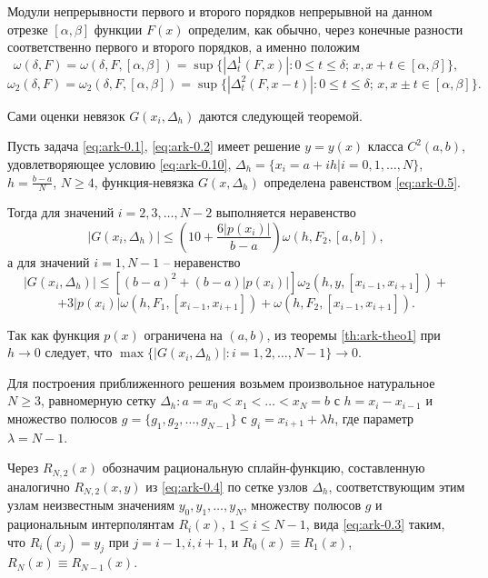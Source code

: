 Модули непрерывности первого и второго порядков непрерывной на данном отрезке 
$[\alpha, \beta]$ функции $F(x)$ определим, как обычно, через конечные разности 
соответственно первого и второго порядков, а именно положим
$$
\omega(\delta, F)=\omega(\delta, F,[\alpha,\beta])=\sup\{|\Delta_t^1(F, x)|:
 0\leqslant t\leqslant \delta;\, x, x+t\in[\alpha, \beta]\},
$$
$$
\omega_2(\delta, F)=\omega_2(\delta, F,[\alpha,\beta])=\sup\{|\Delta_t^2(F, x-t)|:
 0\leqslant t\leqslant \delta; \,x, x\pm t\in[\alpha, \beta]\}.
$$

Сами оценки невязок $G(x_i, \Delta_h)$ даются следующей теоремой.

\begin{theorem} \label{th:ark-theo1}
Пусть задача \eqref{eq:ark-0.1}, \eqref{eq:ark-0.2} имеет решение $y=y(x)$ класса $C^2(a,b)$, удовлетворяющее 
условию \eqref{eq:ark-0.10}, $\Delta_h=\{x_i=a+ih |i=0,1,\dots,N\}$, $h=\frac{b-a}N$,
$N\geqslant 4$, функция-невязка $G(x, \Delta_h)$ определена равенством \eqref{eq:ark-0.5}.

Тогда для значений $i=2,3,\dots,N-2$ выполняется неравенство
\begin{equation}\label{eq:ark-0.12}
|G(x_i,\Delta_h)|\leqslant 
\left(10+\frac{6|p(x_i)|}{b-a}\right)\omega(h, F_2, [a,b]),
\end{equation}
а для значений $i=1,N-1$  -- неравенство
$$
|G(x_i,\Delta_h)|\leqslant [(b-a)^2+(b-a)|p(x_i)|]\omega_2(h, y, [x_{i-1}, x_{i+1}])+
$$
\begin{equation}\label{eq:ark-0.13}
+3|p(x_i)|\omega(h, F_1,[x_{i-1}, x_{i+1}])+
\omega(h, F_2, [x_{i-1}, x_{i+1}]). 
\end{equation}
\end{theorem}

Так как функция $p(x)$ ограничена на $(a,b)$, из теоремы \ref{th:ark-theo1} при $h\to 0$ 
следует, что 
$\max\{|G(x_i, \Delta_h)|: i=1,2,\dots,N-1\}\to 0$.

Для построения приближенного решения возьмем произвольное натуральное $N\geqslant 3$, 
равномерную сетку 
$\Delta_h: a=x_0<x_1<\dots<x_N=b$ с $h=x_i-x_{i-1}$ и множество полюсов 
$g=\{g_1,g_2,\dots,g_{N-1}\}$ с $g_i=x_{i+1}+\lambda h$, где параметр $\lambda=N-1$.

Через $R_{N,2}(x)$ обозначим рациональную сплайн-функцию, составленную
аналогично $R_{N,2}(x,y)$ из \eqref{eq:ark-0.4} по сетке узлов $\Delta_h$, соответствующим этим узлам 
неизвестным 
значениям $y_0,y_1,\dots,y_N$, множеству полюсов $g$ и рациональным интерполянтам
$R_i(x)$, $1\leqslant i\leqslant N-1$, вида \eqref{eq:ark-0.3} таким, что $R_i(x_j)=y_j$ при 
$j=i-1,i,i+1$, и $R_0(x)\equiv R_1(x)$, $R_N(x)\equiv R_{N-1}(x)$.

